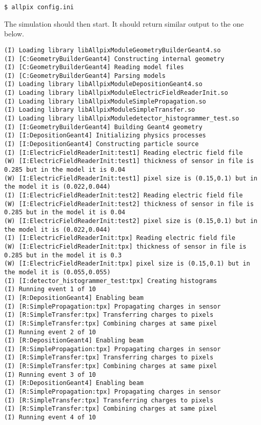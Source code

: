 \begin{verbatim}
$ allpix config.ini
\end{verbatim}

The simulation should then start. It should return similar output to the one below.
\begin{lstlisting}[breaklines]
(I) Loading library libAllpixModuleGeometryBuilderGeant4.so
(I) [C:GeometryBuilderGeant4] Constructing internal geometry
(I) [C:GeometryBuilderGeant4] Reading model files
(I) [C:GeometryBuilderGeant4] Parsing models
(I) Loading library libAllpixModuleDepositionGeant4.so
(I) Loading library libAllpixModuleElectricFieldReaderInit.so
(I) Loading library libAllpixModuleSimplePropagation.so
(I) Loading library libAllpixModuleSimpleTransfer.so
(I) Loading library libAllpixModuledetector_histogrammer_test.so
(I) [I:GeometryBuilderGeant4] Building Geant4 geometry
(I) [I:DepositionGeant4] Initializing physics processes
(I) [I:DepositionGeant4] Constructing particle source
(I) [I:ElectricFieldReaderInit:test1] Reading electric field file
(W) [I:ElectricFieldReaderInit:test1] thickness of sensor in file is 0.285 but in the model it is 0.04
(W) [I:ElectricFieldReaderInit:test1] pixel size is (0.15,0.1) but in the model it is (0.022,0.044)
(I) [I:ElectricFieldReaderInit:test2] Reading electric field file
(W) [I:ElectricFieldReaderInit:test2] thickness of sensor in file is 0.285 but in the model it is 0.04
(W) [I:ElectricFieldReaderInit:test2] pixel size is (0.15,0.1) but in the model it is (0.022,0.044)
(I) [I:ElectricFieldReaderInit:tpx] Reading electric field file
(W) [I:ElectricFieldReaderInit:tpx] thickness of sensor in file is 0.285 but in the model it is 0.3
(W) [I:ElectricFieldReaderInit:tpx] pixel size is (0.15,0.1) but in the model it is (0.055,0.055)
(I) [I:detector_histogrammer_test:tpx] Creating histograms
(I) Running event 1 of 10
(I) [R:DepositionGeant4] Enabling beam
(I) [R:SimplePropagation:tpx] Propagating charges in sensor
(I) [R:SimpleTransfer:tpx] Transferring charges to pixels
(I) [R:SimpleTransfer:tpx] Combining charges at same pixel
(I) Running event 2 of 10
(I) [R:DepositionGeant4] Enabling beam
(I) [R:SimplePropagation:tpx] Propagating charges in sensor
(I) [R:SimpleTransfer:tpx] Transferring charges to pixels
(I) [R:SimpleTransfer:tpx] Combining charges at same pixel
(I) Running event 3 of 10
(I) [R:DepositionGeant4] Enabling beam
(I) [R:SimplePropagation:tpx] Propagating charges in sensor
(I) [R:SimpleTransfer:tpx] Transferring charges to pixels
(I) [R:SimpleTransfer:tpx] Combining charges at same pixel
(I) Running event 4 of 10

\end{lstlisting}
